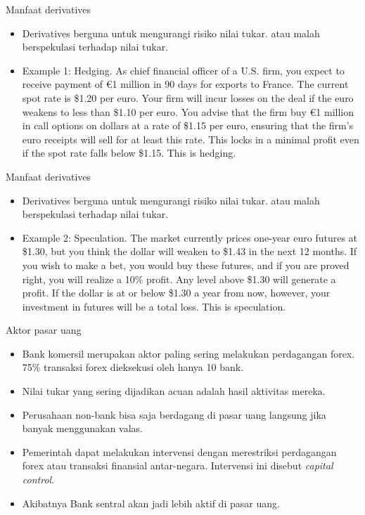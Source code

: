 \documentclass[
  ignorenonframetext,
]{beamer}
\begin{document}
\begin{frame}{Manfaat derivatives}
\label{manfaat-derivatives}
\begin{itemize}
\item
  Derivatives berguna untuk mengurangi risiko nilai tukar. atau malah
  berspekulasi terhadap nilai tukar.
\item
  Example 1: Hedging. As chief financial officer of a U.S. firm, you
  expect to receive payment of €1 million in 90 days for exports to
  France. The current spot rate is \$1.20 per euro. Your firm will incur
  losses on the deal if the euro weakens to less than \$1.10 per euro.
  You advise that the firm buy €1 million in call options on dollars at
  a rate of \$1.15 per euro, ensuring that the firm's euro receipts will
  sell for at least this rate. This locks in a minimal profit even if
  the spot rate falls below \$1.15. This is hedging.
\end{itemize}
\end{frame}

\begin{frame}{Manfaat derivatives}
\label{manfaat-derivatives-1}
\begin{itemize}
\item
  Derivatives berguna untuk mengurangi risiko nilai tukar. atau malah
  berspekulasi terhadap nilai tukar.
\item
  Example 2: Speculation. The market currently prices one-year euro
  futures at \$1.30, but you think the dollar will weaken to \$1.43 in
  the next 12 months. If you wish to make a bet, you would buy these
  futures, and if you are proved right, you will realize a 10\% profit.
  Any level above \$1.30 will generate a profit. If the dollar is at or
  below \$1.30 a year from now, however, your investment in futures will
  be a total loss. This is speculation.
\end{itemize}
\end{frame}

\begin{frame}{Aktor pasar uang}
\label{aktor-pasar-uang}
\begin{itemize}
\item
  Bank komersil merupakan aktor paling sering melakukan perdagangan
  forex. 75\% transaksi forex dieksekusi oleh hanya 10 bank.
\item
  Nilai tukar yang sering dijadikan acuan adalah hasil aktivitas mereka.
\item
  Perusahaan non-bank bisa saja berdagang di pasar uang langsung jika
  banyak menggunakan valas.
\item
  Pemerintah dapat melakukan intervensi dengan merestriksi perdagangan
  forex atau transaksi finansial antar-negara. Intervensi ini disebut
  \emph{capital control}.
\item
  Akibatnya Bank sentral akan jadi lebih aktif di pasar uang.
\end{itemize}
\end{frame}
\end{document}
